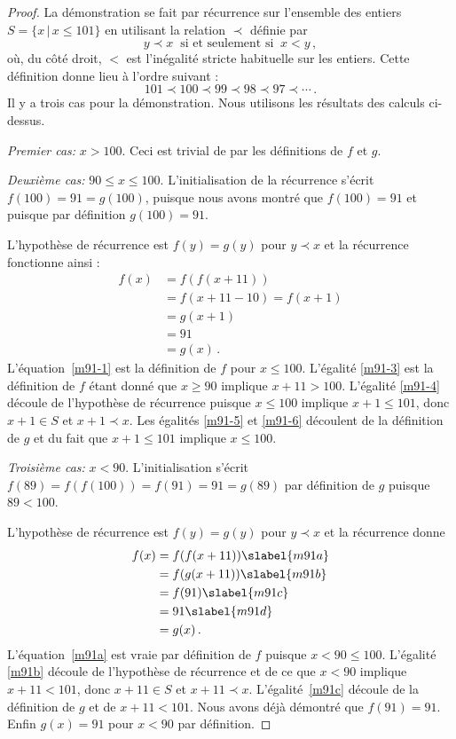 \begin{proof}
La démonstration se fait par récurrence sur l'ensemble des entiers $S=\{x\,|\,x\leq 101\}$ en utilisant la  relation $\prec$ définie par 
\[
y \prec x \;\; \textrm{si et seulement si}\;\; x < y\,,
\]
où, du côté droit,  $<$ est l'inégalité stricte habituelle  sur les entiers.
Cette définition donne lieu à l'ordre suivant :
\[
101 \prec 100 \prec 99 \prec 98 \prec 97 \prec \cdots\,.
\]
Il y a trois cas pour la démonstration. Nous utilisons les résultats des calculs ci-dessus.

\textit{Premier cas:}
$x > 100$. Ceci est trivial de par les définitions de $f$ et $g$.

\textit{Deuxième cas:}
$90\leq x \leq 100$. L'initialisation de la récurrence s'écrit
$
f(100) =  91 = g(100)$, puisque nous avons montré que $f(100)=91$ et puisque par définition $g(100)=91$.

L'hypothèse de récurrence est $f(y) = g(y)$ pour $y\prec x$ et la récurrence fonctionne ainsi :
\begin{subequations}
\begin{align}
f(x) &= f(f(x+11))\label{m91-1}\\
&= f(x+11-10)= f(x+1)\label{m91-3}\\
&= g(x+1)\label{m91-4}\\
&= 91\label{m91-5}\\
&= g(x)\label{m91-6}\,.
\end{align}
\end{subequations}
L'équation~\ref{m91-1} est la définition de $f$ pour $x\leq 100$.
L'égalité  \ref{m91-3} est la définition de $f$ étant donné que $x \geq 90$ implique $x+11 > 100$. L'égalité  \ref{m91-4} découle de l'hypothèse de récurrence puisque $x\leq 100$ implique  $x+1 \leq 101$, donc $x+1\in S$ et $x+1\prec x$. Les égalités  \ref{m91-5} et \ref{m91-6} découlent de la définition de $g$ et du fait que  $x+1 \leq 101$ implique $x \leq 100$.

\textit{Troisième cas:}
$x< 90$. L'initialisation s'écrit 
$f(89) = f(f(100)) = f(91) = 91 = g(89)$ 
par définition de $g$ puisque $89<100$.

L'hypothèse de récurrence est $f(y) = g(y)$ pour $y\prec x$ et la récurrence donne
\begin{subequations}
\begin{align}
f(x) &= f(f(x+11))\slabel{m91a}\\
&= f(g(x+11))\slabel{m91b}\\
&= f(91)\slabel{m91c}\\
&= 91\slabel{m91d}\\
&= g(x)\,.
\end{align}
\end{subequations}
L'équation~\ref{m91a} est vraie par définition de $f$  puisque $x<90\leq 100$.
L'égalité  \ref{m91b} découle de l'hypothèse de récurrence  et de ce que $x < 90$ implique $x+11< 101$, donc $x+11\in S$ et $x+11 \prec x$. L'égalité~\ref{m91c} découle de la définition de $g$ et de $x+11 < 101$. Nous avons déjà démontré que $f(91)=91$. Enfin  $g(x)=91$ pour $x<90$ par définition.
\end{proof}

